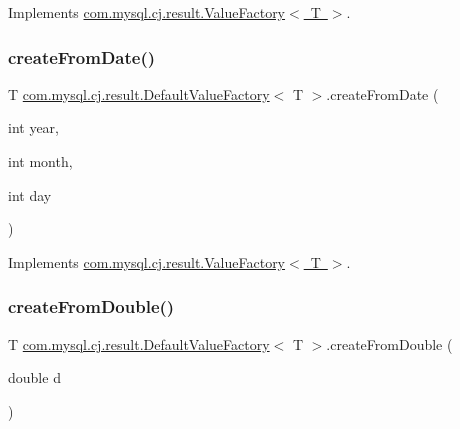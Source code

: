 Implements \mbox{\hyperlink{interfacecom_1_1mysql_1_1cj_1_1result_1_1_value_factory_a0724fcd13ef1ef07c781a61167847a11}{com.\+mysql.\+cj.\+result.\+Value\+Factory$<$ T $>$}}.

\mbox{\label{classcom_1_1mysql_1_1cj_1_1result_1_1_default_value_factory_a7abbef5c2c0a1da994d462bd01bc66ae}} 
\subsubsection{\texorpdfstring{create\+From\+Date()}{createFromDate()}}
{\footnotesize\ttfamily T \mbox{\hyperlink{classcom_1_1mysql_1_1cj_1_1result_1_1_default_value_factory}{com.\+mysql.\+cj.\+result.\+Default\+Value\+Factory}}$<$ T $>$.create\+From\+Date (\begin{DoxyParamCaption}\item[{int}]{year,  }\item[{int}]{month,  }\item[{int}]{day }\end{DoxyParamCaption})}



Implements \mbox{\hyperlink{interfacecom_1_1mysql_1_1cj_1_1result_1_1_value_factory_a5c7828e8fe372c9070e0e64ddafac761}{com.\+mysql.\+cj.\+result.\+Value\+Factory$<$ T $>$}}.

\mbox{\label{classcom_1_1mysql_1_1cj_1_1result_1_1_default_value_factory_a5a769375b9daa8f06534dec605997715}} 
\subsubsection{\texorpdfstring{create\+From\+Double()}{createFromDouble()}}
{\footnotesize\ttfamily T \mbox{\hyperlink{classcom_1_1mysql_1_1cj_1_1result_1_1_default_value_factory}{com.\+mysql.\+cj.\+result.\+Default\+Value\+Factory}}$<$ T $>$.create\+From\+Double (\begin{DoxyParamCaption}\item[{double}]{d }\end{DoxyParamCaption})}



